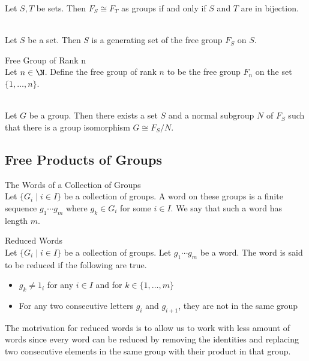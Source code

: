 \documentclass[a4paper]{article}
\begin{document}
\begin{prp}{}{} Let $S,T$ be sets. Then $F_S\cong F_T$ as groups if and only if $S$ and $T$ are in bijection. 
\end{prp}

\begin{lmm}{}{}\\
Let $S$ be a set. Then $S$ is a generating set of the free group $F_S$ on $S$. 
\end{lmm}

\begin{defn}{Free Group of Rank n}{}\\
Let $n\in\N$. Define the free group of rank $n$ to be the free group $F_n$ on the set $\{1,\dots,n\}$. 
\end{defn}

\begin{prp}{}{}\\
Let $G$ be a group. Then there exists a set $S$ and a normal subgroup $N$ of $F_S$ such that there is a group isomorphism $G\cong F_S/N$. 
\end{prp}

\subsection{Free Products of Groups}
\begin{defn}{The Words of a Collection of Groups}{}\\
Let $\{G_i\;|\;i\in I\}$ be a collection of groups. A word on these groups is a finite sequence $g_1\cdots g_m$ where $g_k\in G_i$ for some $i\in I$. We say that such a word has length $m$. 
\end{defn}

\begin{defn}{Reduced Words}{}\\
Let $\{G_i\;|\;i\in I\}$ be a collection of groups. Let $g_1\cdots g_m$ be a word. The word is said to be reduced if the following are true. 
\begin{itemize}
\item $g_k\neq 1_i$ for any $i\in I$ and for $k\in\{1,\dots,m\}$
\item For any two consecutive letters $g_i$ and $g_{i+1}$, they are not in the same group
\end{itemize}
\end{defn}

The motrivation for reduced words is to allow us to work with less amount of words since every word can be reduced by removing the identities and replacing two consecutive elements in the same group with their product in that group. 
\end{document}
